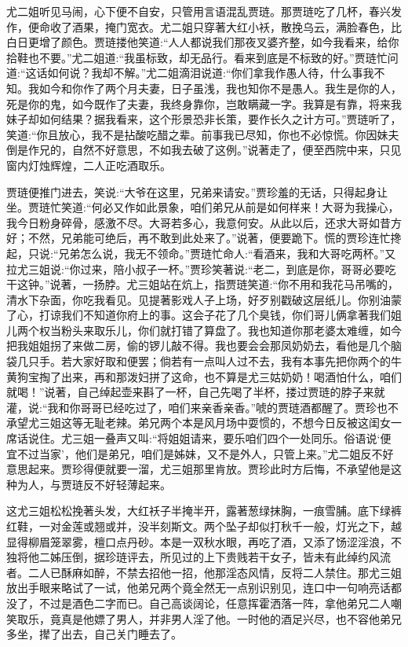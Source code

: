 \begin{parag}
    尤二姐听见马闹，心下便不自安，只管用言语混乱贾琏。那贾琏吃了几杯，春兴发作，便命收了酒果，掩门宽衣。尤二姐只穿著大红小袄，散挽乌云，满脸春色，比白日更增了颜色。贾琏搂他笑道:“人人都说我们那夜叉婆齐整，如今我看来，给你拾鞋也不要。”尤二姐道:“我虽标致，却无品行。看来到底是不标致的好。”贾琏忙问道:“这话如何说？我却不解。”尤二姐滴泪说道:“你们拿我作愚人待，什么事我不知。我如今和你作了两个月夫妻，日子虽浅，我也知你不是愚人。我生是你的人，死是你的鬼，如今既作了夫妻，我终身靠你，岂敢瞒藏一字。我算是有靠，将来我妹子却如何结果？据我看来，这个形景恐非长策，要作长久之计方可。”贾琏听了，笑道:“你且放心，我不是拈酸吃醋之辈。前事我已尽知，你也不必惊慌。你因妹夫倒是作兄的，自然不好意思，不如我去破了这例。”说著走了，便至西院中来，只见窗内灯烛辉煌，二人正吃酒取乐。
\end{parag}


\begin{parag}
    贾琏便推门进去，笑说:“大爷在这里，兄弟来请安。”贾珍羞的无话，只得起身让坐。贾琏忙笑道:“何必又作如此景象，咱们弟兄从前是如何样来！大哥为我操心，我今日粉身碎骨，感激不尽。大哥若多心，我意何安。从此以后，还求大哥如昔方好；不然，兄弟能可绝后，再不敢到此处来了。”说著，便要跪下。慌的贾珍连忙搀起，只说:“兄弟怎么说，我无不领命。”贾琏忙命人:“看酒来，我和大哥吃两杯。”又拉尤三姐说:“你过来，陪小叔子一杯。”贾珍笑著说:“老二，到底是你，哥哥必要吃干这钟。”说著，一扬脖。尤三姐站在炕上，指贾琏笑道:“你不用和我花马吊嘴的，清水下杂面，你吃我看见。见提著影戏人子上场，好歹别戳破这层纸儿。你别油蒙了心，打谅我们不知道你府上的事。这会子花了几个臭钱，你们哥儿俩拿著我们姐儿两个权当粉头来取乐儿，你们就打错了算盘了。我也知道你那老婆太难缠，如今把我姐姐拐了来做二房，偷的锣儿敲不得。我也要会会那凤奶奶去，看他是几个脑袋几只手。若大家好取和便罢；倘若有一点叫人过不去，我有本事先把你两个的牛黄狗宝掏了出来，再和那泼妇拼了这命，也不算是尤三姑奶奶！喝酒怕什么，咱们就喝！”说著，自己绰起壶来斟了一杯，自己先喝了半杯，搂过贾琏的脖子来就灌，说:“我和你哥哥已经吃过了，咱们来亲香亲香。”唬的贾琏酒都醒了。贾珍也不承望尤三姐这等无耻老辣。弟兄两个本是风月场中耍惯的，不想今日反被这闺女一席话说住。尤三姐一叠声又叫:“将姐姐请来，要乐咱们四个一处同乐。俗语说‘便宜不过当家’，他们是弟兄，咱们是姊妹，又不是外人，只管上来。”尤二姐反不好意思起来。贾珍得便就要一溜，尤三姐那里肯放。贾珍此时方后悔，不承望他是这种为人，与贾琏反不好轻薄起来。
\end{parag}


\begin{parag}
    这尤三姐松松挽著头发，大红袄子半掩半开，露著葱绿抹胸，一痕雪脯。底下绿裤红鞋，一对金莲或翘或并，没半刻斯文。两个坠子却似打秋千一般，灯光之下，越显得柳眉笼翠雾，檀口点丹砂。本是一双秋水眼，再吃了酒，又添了饧涩淫浪，不独将他二姊压倒，据珍琏评去，所见过的上下贵贱若干女子，皆未有此绰约风流者。二人已酥麻如醉，不禁去招他一招，他那淫态风情，反将二人禁住。那尤三姐放出手眼来略试了一试，他弟兄两个竟全然无一点别识别见，连口中一句响亮话都没了，不过是酒色二字而已。自己高谈阔论，任意挥霍洒落一阵，拿他弟兄二人嘲笑取乐，竟真是他嫖了男人，并非男人淫了他。一时他的酒足兴尽，也不容他弟兄多坐，撵了出去，自己关门睡去了。
\end{parag}


